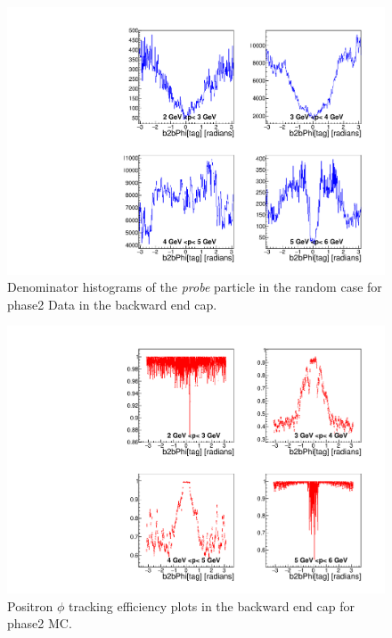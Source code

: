\documentclass[a4paper,11pt,twosided,final,german,openbib,pdftex,listof=totoc,bibliography=totoc]{scrbook}
\begin{document}
\begin{appendix}
\begin{figure}[!htbp]
	\centering
	\includegraphics[width=\textwidth]{Plots/master/xPMPhiRandomECD_Data}
	\caption[Momentum $\phi$ Random Backward End Cap Denominator Histogram Phase2 Data]{Denominator histograms of the \textit{probe} particle in the random case for phase2 Data in the backward end cap.}
	\label{plt:PMPhiRandomECD_Data}
\end{figure}


\begin{figure}[!htbp]
	\centering
	\includegraphics[width=\textwidth]{Plots/master/xPMPhiepEC_MC}
	\caption[Momentum $\phi$ Positron Backward End Cap Efficiency Phase2 MC]{Positron $\phi$ tracking efficiency plots in the backward end cap for phase2 MC.}
	\label{plt:PMPhiepEC_MC}
\end{figure}



\end{appendix}
\end{document}

